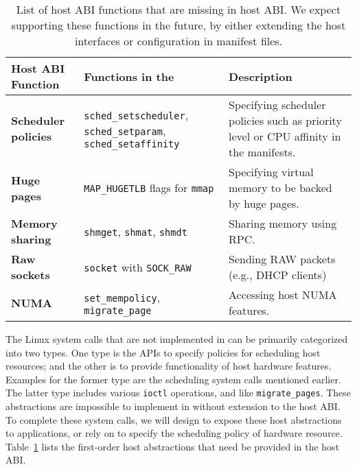\begin{table}[t]
\footnotesize
\centering
\begin{tabular}{>{\bf}p{1.2in}>{\raggedright\arraybackslash}p{2.4in}>{\raggedright\arraybackslash}p{2.4in}}
\toprule
{\bf Host ABI Function} & {\bf Functions in the \libos{}} & {\bf Description} \\
\midrule
Scheduler policies & {\tt sched\_setscheduler}, {\tt sched\_setparam}, {\tt sched\_setaffinity} & Specifying scheduler policies such as priority level or CPU affinity in the manifests.\\
\midrule
Huge pages & {\tt MAP\_HUGETLB} flags for {\tt mmap} & Specifying virtual memory to be backed by huge pages. \\
\midrule
Memory sharing & {\tt shmget}, {\tt shmat}, {\tt shmdt} & Sharing memory using RPC. \\
\midrule
Raw sockets & {\tt socket} with {\tt SOCK\_RAW}  & Sending RAW packets (e.g., DHCP clients) \\
\midrule
NUMA & {\tt set\_mempolicy}, {\tt migrate\_page} & Accessing host NUMA features. \\
\bottomrule
\end{tabular}
\caption[List of host ABI functions to be added in \graphene{} as future works]
{List of host ABI functions that are missing in \graphene{} host ABI.
We expect supporting these functions in the future,
by either extending the host interfaces or configuration in manifest files.}
\label{tab:future:abi}
\end{table}


The Linux system calls that are not implemented in \graphene{}
can be primarily categorized into two types.
One type is the APIs
to specify policies for scheduling host resources;
and the other is to provide functionality of host hardware features.
Examples for the former type are the scheduling system calls mentioned earlier.
The latter type includes
various {\tt ioctl} operations,
and  like {\tt migrate\_pages}.
These abstractions are impossible to implement in \liboses{}
without extension to the host ABI.
To complete these system calls,
we will design  to expose these host abstractions
to applications,
or rely on 
to specify the scheduling policy of hardware resource.
Table~\ref{tab:future:abi} lists the first-order host abstractions
that need be provided in the \graphene{} host ABI.


